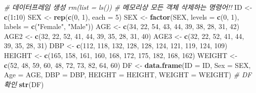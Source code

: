 \documentclass[11pt,a4paper]{book}
\newenvironment{Shaded}{\begin{snugshade}}{\end{snugshade}}
\newcommand{\KeywordTok}[1]{\textcolor[rgb]{0.13,0.29,0.53}{\textbf{#1}}}
\newcommand{\DataTypeTok}[1]{\textcolor[rgb]{0.13,0.29,0.53}{#1}}
\newcommand{\DecValTok}[1]{\textcolor[rgb]{0.00,0.00,0.81}{#1}}
\newcommand{\StringTok}[1]{\textcolor[rgb]{0.31,0.60,0.02}{#1}}
\newcommand{\CommentTok}[1]{\textcolor[rgb]{0.56,0.35,0.01}{\textit{#1}}}
\newcommand{\OperatorTok}[1]{\textcolor[rgb]{0.81,0.36,0.00}{\textbf{#1}}}
\newcommand{\NormalTok}[1]{#1}
\theoremstyle{definition}
\theoremstyle{definition}
\theoremstyle{definition}
\theoremstyle{remark}
\begin{document}
\begin{Shaded}
\begin{Highlighting}[]
\CommentTok{# 데이터프레임 생성 rm(list = ls()) # 메모리상 모든 객체 삭제하는 명령어!!}
\NormalTok{ID <-}\StringTok{ }\KeywordTok{c}\NormalTok{(}\DecValTok{1}\OperatorTok{:}\DecValTok{10}\NormalTok{)}
\NormalTok{SEX <-}\StringTok{ }\KeywordTok{rep}\NormalTok{(}\KeywordTok{c}\NormalTok{(}\DecValTok{0}\NormalTok{, }\DecValTok{1}\NormalTok{), }\DataTypeTok{each =} \DecValTok{5}\NormalTok{)}
\NormalTok{SEX <-}\StringTok{ }\KeywordTok{factor}\NormalTok{(SEX, }\DataTypeTok{levels =} \KeywordTok{c}\NormalTok{(}\DecValTok{0}\NormalTok{, }\DecValTok{1}\NormalTok{), }\DataTypeTok{labels =} \KeywordTok{c}\NormalTok{(}\StringTok{"Female"}\NormalTok{, }\StringTok{"Male"}\NormalTok{))}
\NormalTok{AGE <-}\StringTok{ }\KeywordTok{c}\NormalTok{(}\DecValTok{34}\NormalTok{, }\DecValTok{22}\NormalTok{, }\DecValTok{54}\NormalTok{, }\DecValTok{43}\NormalTok{, }\DecValTok{44}\NormalTok{, }\DecValTok{39}\NormalTok{, }\DecValTok{38}\NormalTok{, }\DecValTok{28}\NormalTok{, }\DecValTok{31}\NormalTok{, }\DecValTok{42}\NormalTok{)}
\NormalTok{AGE2 <-}\StringTok{ }\KeywordTok{c}\NormalTok{(}\DecValTok{32}\NormalTok{, }\DecValTok{22}\NormalTok{, }\DecValTok{52}\NormalTok{, }\DecValTok{41}\NormalTok{, }\DecValTok{44}\NormalTok{, }\DecValTok{39}\NormalTok{, }\DecValTok{35}\NormalTok{, }\DecValTok{28}\NormalTok{, }\DecValTok{31}\NormalTok{, }\DecValTok{40}\NormalTok{)}
\NormalTok{AGE3 <-}\StringTok{ }\KeywordTok{c}\NormalTok{(}\DecValTok{32}\NormalTok{, }\DecValTok{22}\NormalTok{, }\DecValTok{52}\NormalTok{, }\DecValTok{41}\NormalTok{, }\DecValTok{44}\NormalTok{, }\DecValTok{39}\NormalTok{, }\DecValTok{35}\NormalTok{, }\DecValTok{28}\NormalTok{, }\DecValTok{31}\NormalTok{)}
\NormalTok{DBP <-}\StringTok{ }\KeywordTok{c}\NormalTok{(}\DecValTok{112}\NormalTok{, }\DecValTok{118}\NormalTok{, }\DecValTok{132}\NormalTok{, }\DecValTok{128}\NormalTok{, }\DecValTok{128}\NormalTok{, }\DecValTok{124}\NormalTok{, }\DecValTok{121}\NormalTok{, }\DecValTok{119}\NormalTok{, }\DecValTok{124}\NormalTok{, }\DecValTok{109}\NormalTok{)}
\NormalTok{HEIGHT <-}\StringTok{ }\KeywordTok{c}\NormalTok{(}\DecValTok{165}\NormalTok{, }\DecValTok{158}\NormalTok{, }\DecValTok{161}\NormalTok{, }\DecValTok{160}\NormalTok{, }\DecValTok{168}\NormalTok{, }\DecValTok{172}\NormalTok{, }\DecValTok{175}\NormalTok{, }\DecValTok{182}\NormalTok{, }\DecValTok{168}\NormalTok{, }\DecValTok{162}\NormalTok{)}
\NormalTok{WEIGHT <-}\StringTok{ }\KeywordTok{c}\NormalTok{(}\DecValTok{52}\NormalTok{, }\DecValTok{48}\NormalTok{, }\DecValTok{59}\NormalTok{, }\DecValTok{60}\NormalTok{, }\DecValTok{48}\NormalTok{, }\DecValTok{72}\NormalTok{, }\DecValTok{73}\NormalTok{, }\DecValTok{82}\NormalTok{, }\DecValTok{64}\NormalTok{, }\DecValTok{60}\NormalTok{)}
\NormalTok{DF <-}\StringTok{ }\KeywordTok{data.frame}\NormalTok{(}\DataTypeTok{ID =}\NormalTok{ ID, }\DataTypeTok{Sex =}\NormalTok{ SEX, }\DataTypeTok{Age =}\NormalTok{ AGE, }\DataTypeTok{DBP =}\NormalTok{ DBP, }\DataTypeTok{HEIGHT =}\NormalTok{ HEIGHT, }\DataTypeTok{WEIGHT =}\NormalTok{ WEIGHT)}
\CommentTok{# DF 확인}
\KeywordTok{str}\NormalTok{(DF)}
\end{Highlighting}
\end{Shaded}
\end{document}

